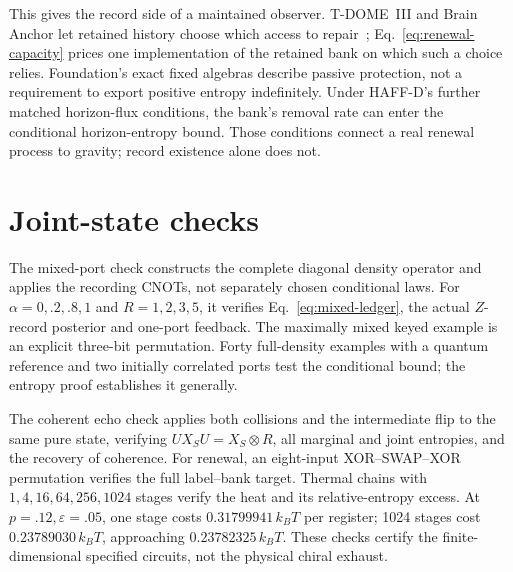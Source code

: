 \documentclass[12pt,a4paper]{article}
\begin{document}
This gives the record side of a maintained observer. T-DOME~III and
Brain Anchor let retained history choose which access to repair~\cite{Liu2026BRAIN};
Eq.~\eqref{eq:renewal-capacity} prices one implementation of the
retained bank on which such a choice relies. Foundation's exact fixed
algebras describe passive protection, not a requirement to export
positive entropy indefinitely. Under HAFF-D's further matched
horizon-flux conditions, the bank's removal rate can enter the
conditional horizon-entropy bound. Those conditions connect a real
renewal process to gravity; record existence alone does not.

\section{Joint-state checks}\label{app:checks}

The mixed-port check constructs the complete diagonal density operator
and applies the recording CNOTs, not separately chosen conditional laws.
For \(\alpha=0,.2,.8,1\) and \(R=1,2,3,5\), it verifies
Eq.~\eqref{eq:mixed-ledger}, the actual \(Z\)-record posterior and
one-port feedback. The maximally mixed keyed example is an explicit
three-bit permutation. Forty full-density examples with a quantum
reference and two initially correlated ports test the conditional bound;
the entropy proof establishes it generally.

The coherent echo check applies both collisions and the intermediate
flip to the same pure state, verifying \(U X_S U=X_S\otimes R\),
all marginal and joint entropies, and the recovery of coherence.
For renewal, an eight-input XOR--SWAP--XOR permutation verifies the
full label--bank target. Thermal chains with \(1,4,16,64,256,1024\)
stages verify the heat and its relative-entropy excess. At
\(p=.12,\varepsilon=.05\), one stage costs \(0.31799941\,k_BT\)
per register; 1024 stages cost \(0.23789030\,k_BT\), approaching
\(0.23782325\,k_BT\). These checks certify the finite-dimensional
specified circuits, not the physical chiral exhaust.
\end{document}
